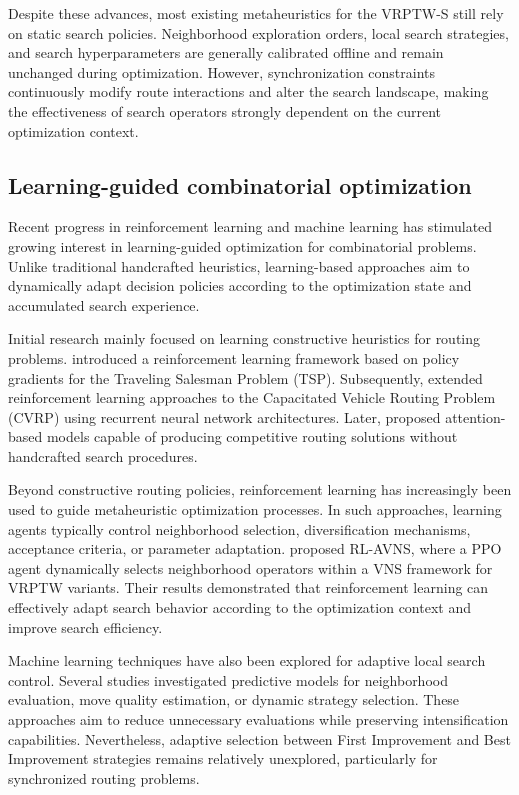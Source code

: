 \documentclass[preprint,12pt]{elsarticle}
\begin{document}
Despite these advances, most existing metaheuristics for the VRPTW-S still rely on static search policies. Neighborhood exploration orders, local search strategies, and search hyperparameters are generally calibrated offline and remain unchanged during optimization. However, synchronization constraints continuously modify route interactions and alter the search landscape, making the effectiveness of search operators strongly dependent on the current optimization context.

\subsection{Learning-guided combinatorial optimization}
Recent progress in reinforcement learning and machine learning has stimulated growing interest in learning-guided optimization for combinatorial problems. Unlike traditional handcrafted heuristics, learning-based approaches aim to dynamically adapt decision policies according to the optimization state and accumulated search experience.

Initial research mainly focused on learning constructive heuristics for routing problems. \citet{bello2017neural} introduced a reinforcement learning framework based on policy gradients for the Traveling Salesman Problem (TSP). Subsequently, \citet{nazari2018reinforcement} extended reinforcement learning approaches to the Capacitated Vehicle Routing Problem (CVRP) using recurrent neural network architectures. Later, \citet{kool2019attention} proposed attention-based models capable of producing competitive routing solutions without handcrafted search procedures.

Beyond constructive routing policies, reinforcement learning has increasingly been used to guide metaheuristic optimization processes. In such approaches, learning agents typically control neighborhood selection, diversification mechanisms, acceptance criteria, or parameter adaptation. \citet{xu2023learning} proposed RL-AVNS, where a PPO agent dynamically selects neighborhood operators within a VNS framework for VRPTW variants. Their results demonstrated that reinforcement learning can effectively adapt search behavior according to the optimization context and improve search efficiency.

Machine learning techniques have also been explored for adaptive local search control. Several studies investigated predictive models for neighborhood evaluation, move quality estimation, or dynamic strategy selection. These approaches aim to reduce unnecessary evaluations while preserving intensification capabilities. Nevertheless, adaptive selection between First Improvement and Best Improvement strategies remains relatively unexplored, particularly for synchronized routing problems.
\end{document}
